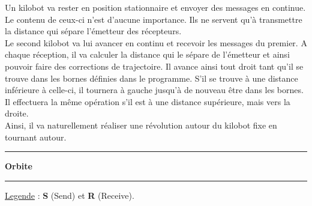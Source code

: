 \documentclass[a4paper,8pt]{report}
\begin{document}
Un kilobot va rester en position stationnaire et envoyer des messages en continue. Le contenu de ceux-ci n'est d'aucune importance. Ils ne servent qu'\`a transmettre la distance qui s\'epare l’\'emetteur des r\'ecepteurs.\\
Le second kilobot va lui avancer en continu et recevoir les messages du premier. A chaque r\'eception, il va calculer la distance qui le s\'epare de l'\'emetteur et ainsi pouvoir faire des corrections de trajectoire. Il avance ainsi tout droit tant qu'il se trouve dans les bornes d\'efinies dans le programme. S'il se trouve à une distance inf\'erieure à celle-ci, il tournera à gauche jusqu’à de nouveau être dans les bornes. Il effectuera la même op\'eration s'il est à une distance sup\'erieure, mais vers la droite.\\
Ainsi, il va naturellement r\'ealiser une r\'evolution autour du kilobot fixe en tournant autour.\\

\newpage
\begin{center}
  \rule{\linewidth}{.5pt}
  \textbf{Orbite}\\
  \rule{\linewidth}{.5pt}
\end{center}
\underline{Legende} : \textbf{S} (Send) et \textbf{R} (Receive).\\
\end{document}
